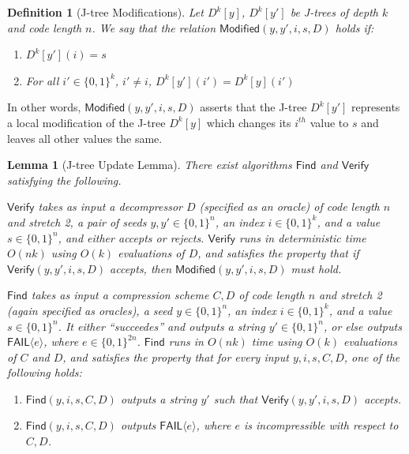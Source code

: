 \documentclass[11pt]{article}
\newtheorem{lemma}{Lemma}
\newtheorem{definition}{Definition}
\newcommand{\B}{\{0,1\}}
\begin{document}
\begin{definition}[J-tree Modifications]
Let $D^k[y]$, $D^k[y']$ be J-trees of depth $k$ and code length $n$. We say that the relation $\mathsf{Modified}(y,y',i,s,D)$ holds if:
\begin{enumerate}
    \item $D^k[y'](i)=s$
    \item For all $i' \in \B^k$, $i'\neq i$, $D^k[y'](i') = D^k[y](i')$
\end{enumerate}
\end{definition}
In other words, $\mathsf{Modified}(y,y',i,s,D)$ asserts that the J-tree $D^k[y']$ represents a local modification of the J-tree $D^k[y]$ which changes its $i^{th}$ value to $s$ and leaves all other values the same.
\begin{lemma}[J-tree Update Lemma]\label{lem:updates}
 There exist algorithms $\mathsf{Find}$ and $\mathsf{Verify}$ satisfying the following. 

$\mathsf{Verify}$ takes as input a decompressor $D$ (specified as an oracle) of code length $n$ and stretch 2, a pair of seeds $y,y' \in \B^n$, an index $i \in \B^k$, and a value $s \in \B^n$, and either accepts or rejects. $\mathsf{Verify}$ runs in deterministic time $O(nk)$ using $O(k)$ evaluations of $D$, and satisfies the property that if $\mathsf{Verify}(y,y',i,s,D)$ accepts, then $\mathsf{Modified}(y,y',i,s,D)$ must hold.

$\mathsf{Find}$ takes as input a compression scheme $C,D$ of code length $n$ and stretch 2 (again specified as oracles), a seed $y \in \B^n$, an index $i \in \B^k$, and a value $s \in \B^n$. It either ``succeedes'' and outputs a string $y'\in \B^n$, or else outputs $\mathsf{FAIL}\langle e \rangle$, where $e \in \B^{2n}$. $\mathsf{Find}$ runs in $O(nk)$ time using $O(k)$ evaluations of $C$ and $D$, and satisfies the property that for every input $y,i,s,C,D$, one of the following holds:
\begin{enumerate}
    \item $\mathsf{Find}(y,i,s,C,D)$ outputs a string $y'$ such that $\mathsf{Verify}(y,y',i,s,D)$ accepts.
    \item $\mathsf{Find}(y,i,s,C,D)$ outputs $\mathsf{FAIL}\langle e \rangle$, where $e$ is incompressible with respect to $C,D$.
\end{enumerate}

\end{lemma}
\end{document}
